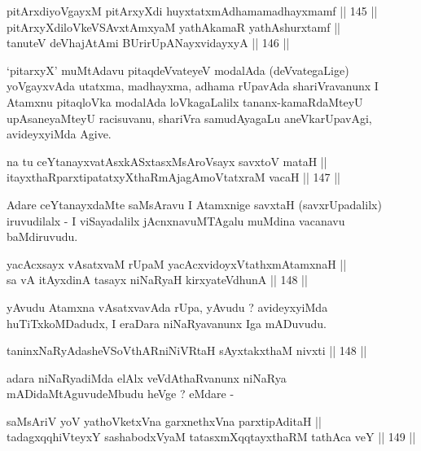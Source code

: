 
\begin{shl}
pitArxdiyoVgayxM pitArxyXdi huyxtatxmAdhamamadhayxmamf \hfill || 145 ||  \\
pitArxyXdiloVkeVSAvxtAmx\s yaM yathAkamaR yathAshurxtamf ||  \\
tanuteV deVhajAtAmi BUrirUpANayxvidayxyA \hfill || 146 ||  
\end{shl}

\begin{artha}
`pitarxyX' muMtAdavu pitaqdeVvateyeV modalAda (deVvategaLige)
yoVgayxvAda utatxma, madhayxma, adhama rUpavAda shariVravanunx I
Atamxnu pitaqloVka modalAda loVkagaLalilx tananx-kamaRdaMteyU
upAsaneyaMteyU racisuvanu, shariVra samudAyagaLu aneVkarUpavAgi,
avideyxyiMda Agive.
\end{artha}

\begin{shl}
na tu ceYtanayxvatAsxkASxtasxMsAroV\s sayx savxtoV mataH || \\
itayxthaRparxtipatatxyXthaRmAjagAmoVtatxraM vacaH \hfill || 147 ||  
\end{shl}

\begin{artha}
Adare ceYtanayxdaMte saMsAravu I Atamxnige savxtaH (savxrUpadalilx)
iruvudilalx - I viSayadalilx jAcnxnavuMTAgalu muMdina vacanavu baMdiruvudu.
\end{artha}

\begin{shl}
yacAcxsayx vAsatxvaM rUpaM yacAcxvidoyxVtathxmAtamxnaH || \\
sa vA itAyxdinA tasayx niNaRyaH kirxyateV\s dhunA || 148 ||
\end{shl}

\begin{artha}
yAvudu Atamxna vAsatxvavAda rUpa, yAvudu ? avideyxyiMda
huTiTxkoMDadudx, I eraDara niNaRyavanunx Iga mADuvudu.
\end{artha}

\begin{shl}
taninxNaRyAdasheVSoV\s thAR\s niNiVRtaH sAyxtakxthaM nivxti \hfill || 148 ||  
\end{shl}

\begin{artha}
adara niNaRyadiMda elAlx veVdAthaRvanunx niNaRya mADidaMtAguvudeMbudu
heVge ? eMdare -
\end{artha}

\begin{shl}
saMsAriV yoV yathoVketxVna garxnethxVna parxtipAditaH || \\
tadagxqqhiVteyxY sashabodxV\s yaM tatasxmXqqtayxthaRM tathAca veY \hfill || 149 ||  
\end{shl}

